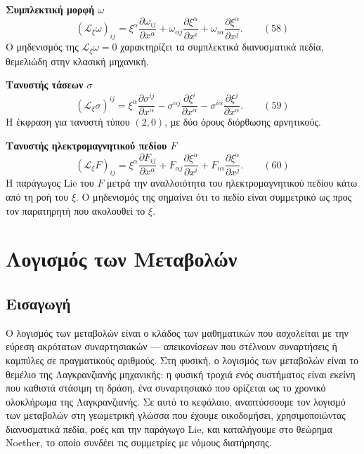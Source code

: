 \documentclass[12pt]{article}
\begin{document}
\textbf{Συμπλεκτική μορφή $\omega$}
\begin{equation}
(\mathcal{L}_\xi \omega)_{ij} = \xi^\alpha \frac{\partial \omega_{ij}}{\partial x^\alpha} + \omega_{\alpha j} \frac{\partial \xi^\alpha}{\partial x^i} + \omega_{i\alpha} \frac{\partial \xi^\alpha}{\partial x^j}. \qquad (58)
\end{equation}
Ο μηδενισμός της $\mathcal{L}_\xi \omega = 0$ χαρακτηρίζει τα συμπλεκτικά διανυσματικά πεδία, θεμελιώδη στην κλασική μηχανική.

\textbf{Τανυστής τάσεων $\sigma$}
\begin{equation}
(\mathcal{L}_\xi \sigma)^{ij} = \xi^\alpha \frac{\partial \sigma^{ij}}{\partial x^\alpha} - \sigma^{\alpha j} \frac{\partial \xi^i}{\partial x^\alpha} - \sigma^{i\alpha} \frac{\partial \xi^j}{\partial x^\alpha}. \qquad (59)
\end{equation}
Η έκφραση για τανυστή τύπου $(2,0)$, με δύο όρους διόρθωσης αρνητικούς.

\textbf{Τανυστής ηλεκτρομαγνητικού πεδίου $F$}
\begin{equation}
(\mathcal{L}_\xi F)_{ij} = \xi^\alpha \frac{\partial F_{ij}}{\partial x^\alpha} + F_{\alpha j} \frac{\partial \xi^\alpha}{\partial x^i} + F_{i\alpha} \frac{\partial \xi^\alpha}{\partial x^j}. \qquad (60)
\end{equation}
Η παράγωγος Lie του $F$ μετρά την αναλλοιότητα του ηλεκτρομαγνητικού πεδίου κάτω από τη ροή του $\xi$. Ο μηδενισμός της σημαίνει ότι το πεδίο είναι συμμετρικό ως προς τον παρατηρητή που ακολουθεί το $\xi$.

\section{Λογισμός των Μεταβολών}

\subsection{Εισαγωγή}

Ο λογισμός των μεταβολών είναι ο κλάδος των μαθηματικών που ασχολείται με την εύρεση ακρότατων συναρτησιακών — απεικονίσεων που στέλνουν συναρτήσεις ή καμπύλες σε πραγματικούς αριθμούς. Στη φυσική, ο λογισμός των μεταβολών είναι το θεμέλιο της Λαγκρανζιανής μηχανικής: η φυσική τροχιά ενός συστήματος είναι εκείνη που καθιστά στάσιμη τη δράση, ένα συναρτησιακό που ορίζεται ως το χρονικό ολοκλήρωμα της Λαγκρανζιανής. Σε αυτό το κεφάλαιο, αναπτύσσουμε τον λογισμό των μεταβολών στη γεωμετρική γλώσσα που έχουμε οικοδομήσει, χρησιμοποιώντας διανυσματικά πεδία, ροές και την παράγωγο Lie, και καταλήγουμε στο θεώρημα Noether, το οποίο συνδέει τις συμμετρίες με νόμους διατήρησης.
\end{document}
